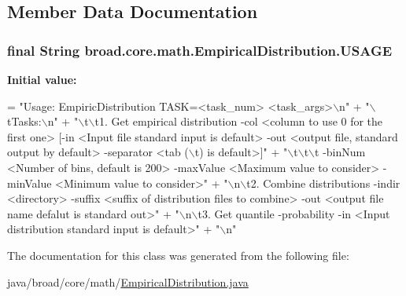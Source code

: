 \subsection{Member Data Documentation}
\hypertarget{classbroad_1_1core_1_1math_1_1_empirical_distribution_a3dda9f8a7807b2035a661abc5aef24f4}{
\subsubsection[{U\+S\+A\+G\+E}]{\setlength{\rightskip}{0pt plus 5cm}final String broad.\+core.\+math.\+Empirical\+Distribution.\+U\+S\+A\+G\+E\hspace{0.3cm}{\ttfamily [static]}}}\label{classbroad_1_1core_1_1math_1_1_empirical_distribution_a3dda9f8a7807b2035a661abc5aef24f4}
{\bfseries Initial value\+:}
\begin{DoxyCode}
= \textcolor{stringliteral}{"Usage: EmpiricDistribution TASK=<task\_num> <task\_args>\(\backslash\)n"} +
    \textcolor{stringliteral}{"\(\backslash\)tTasks:\(\backslash\)n"} +
    \textcolor{stringliteral}{"\(\backslash\)t\(\backslash\)t1. Get empirical distribution -col <column to use 0 for the first one> [-in <Input file standard
       input is default> -out <output file, standard output by default> -separator <tab (\(\backslash\)t) is default>]"} +
    \textcolor{stringliteral}{"\(\backslash\)t\(\backslash\)t\(\backslash\)t -binNum <Number of bins, default is 200> -maxValue <Maximum value to consider> -minValue
       <Minimum value to consider>"} +
    \textcolor{stringliteral}{"\(\backslash\)n\(\backslash\)t2. Combine distributions -indir <directory> -suffix <suffix of distribution files to combine> -out
       <output file name defalut is standard out>"} +
    \textcolor{stringliteral}{"\(\backslash\)n\(\backslash\)t3. Get quantile -probability -in <Input distribution standard input is default>"} +
    \textcolor{stringliteral}{"\(\backslash\)n"}
\end{DoxyCode}


The documentation for this class was generated from the following file\+:\begin{DoxyCompactItemize}
\item 
java/broad/core/math/\hyperlink{_empirical_distribution_8java}{Empirical\+Distribution.\+java}\end{DoxyCompactItemize}
